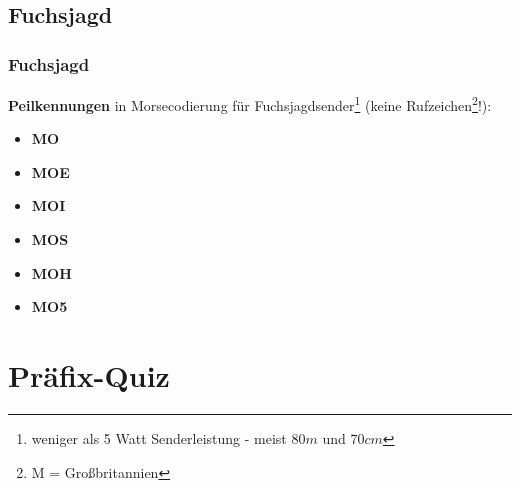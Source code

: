 \subsection{Fuchsjagd}

\begin{frame}
  \frametitle{Fuchsjagd}

  \textbf{Peilkennungen} in Morsecodierung für Fuchsjagdsender\footnote{weniger als 5 Watt
  Senderleistung - meist $80m$ und $70cm$} (keine Rufzeichen\footnote{M = Großbritannien}!):

  \begin{itemize}
    \item \textbf{MO}
    \item \textbf{MOE}
    \item \textbf{MOI}
    \item \textbf{MOS}
    \item \textbf{MOH}
    \item \textbf{MO5}
  \end{itemize}

\end{frame}

\section[]{Präfix-Quiz}

